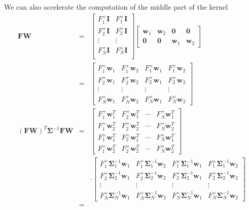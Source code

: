 \documentclass{article}
\begin{document}
We can also accelerate the computation of the middle part of the kernel
\begin{eqnarray}
\mathbf{FW}&=&
\left[
\begin{array}{cc}
F_1^+\mathbf{I} & F_1^\times\mathbf{I} \\
F_2^+\mathbf{I} & F_2^\times\mathbf{I} \\
\vdots & \vdots \\
F_N^+\mathbf{I} & F_N^\times\mathbf{I} \\
\end{array}
\right]\left[
\begin{array}{cccc}
\mathbf{w}_1 & \mathbf{w}_2 & \mathbf{0} & \mathbf{0} \\
\mathbf{0} & \mathbf{0} & \mathbf{w}_1 & \mathbf{w}_2
\end{array}
\right]\\
&=&
\left[
\begin{array}{cccc}
F_1^+\mathbf{w}_1 & F_1^+\mathbf{w}_2 & F_1^\times\mathbf{w}_1 & F_1^\times\mathbf{w}_2 \\
F_2^+\mathbf{w}_1 & F_2^+\mathbf{w}_2 & F_2^\times\mathbf{w}_1 & F_2^\times\mathbf{w}_2 \\
\vdots & \vdots & \vdots & \vdots \\
F_N^+\mathbf{w}_1 & F_N^+\mathbf{w}_2 & F_N^\times\mathbf{w}_1 & F_N^\times\mathbf{w}_2
\end{array}
\right]\\
\mathbf{(FW)}^T\mathbf{\Sigma}^{-1}\mathbf{FW}&=&
\left[
\begin{array}{cccc}
F_1^+\mathbf{w}_1^T & F_2^+\mathbf{w}^T_1 & \cdots & F_N^+\mathbf{w}^T_1 \\
F_1^+\mathbf{w}_2^T & F_2^+\mathbf{w}^T_2 & \cdots & F_N^+\mathbf{w}^T_2 \\
F_1^\times\mathbf{w}^T_1 & F_2^\times\mathbf{w}^T_1 & \cdots & F_N^\times\mathbf{w}^T_1 \\
F_1^\times\mathbf{w}^T_2 & F_2^\times\mathbf{w}^T_2 & \cdots & F_N^\times\mathbf{w}^T_2
\end{array}
\right]\\
&&\cdot
\left[
\begin{array}{cccc}
F_1^+\mathbf{\Sigma}_1^{-1}\mathbf{w}_1 & F_1^+\mathbf{\Sigma}_1^{-1}\mathbf{w}_2 & F_1^\times\mathbf{\Sigma}_1^{-1}\mathbf{w}_1 & F_1^\times\mathbf{\Sigma}_1^{-1}\mathbf{w}_2
\\
F_2^+\mathbf{\Sigma}_2^{-1}\mathbf{w}_1 & F_2^+\mathbf{\Sigma}_2^{-1}\mathbf{w}_2 & F_2^\times\mathbf{\Sigma}_2^{-1}\mathbf{w}_1 & F_2^\times\mathbf{\Sigma}_2^{-1}\mathbf{w}_2
\\
\vdots & \vdots & \vdots & \vdots
\\
F_N^+\mathbf{\Sigma}_N^{-1}\mathbf{w}_1 & F_N^+\mathbf{\Sigma}_N^{-1}\mathbf{w}_2 & F_N^\times\mathbf{\Sigma}_N^{-1}\mathbf{w}_1 & F_N^\times\mathbf{\Sigma}_N^{-1}\mathbf{w}_2
\end{array}
\right]\\
&=&
\end{eqnarray}
\end{document}
